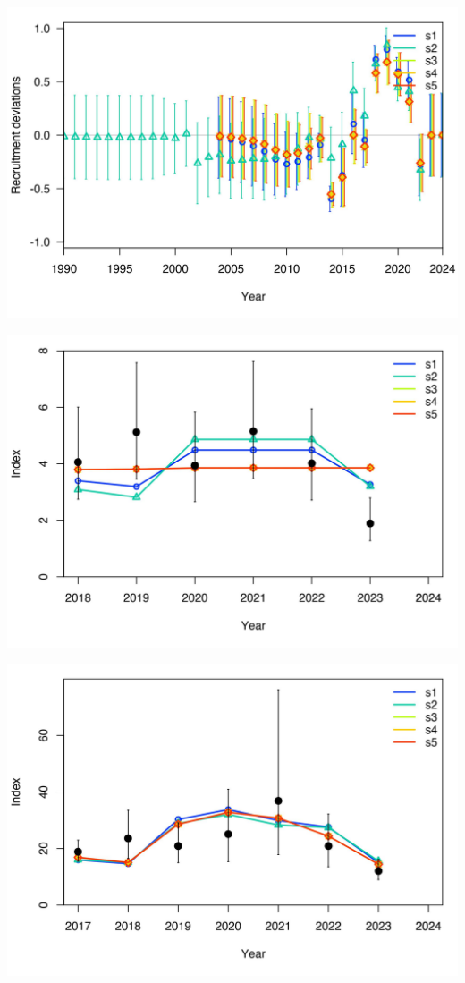 \documentclass[
]{article}
\begin{document}
\begin{center}\includegraphics{Dtrunculus_SS3_2024_files/figure-latex/unnamed-chunk-17-11} \end{center}

\begin{center}\includegraphics{Dtrunculus_SS3_2024_files/figure-latex/unnamed-chunk-17-12} \end{center}

\begin{center}\includegraphics{Dtrunculus_SS3_2024_files/figure-latex/unnamed-chunk-17-13} \end{center}
\end{document}
